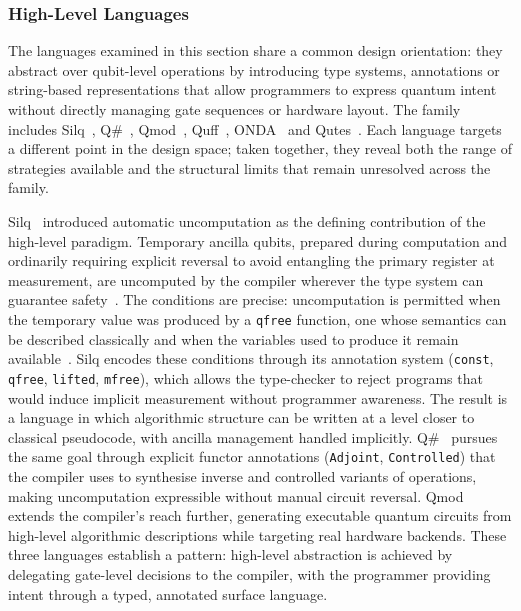 \subsubsection{High-Level Languages}\label{subsubsec:lit_rev:qpl:highlevel}
The languages examined in this section share a common design orientation: they abstract over qubit-level operations by introducing type systems, annotations or string-based representations that allow programmers to express quantum intent without directly managing gate sequences or hardware layout.
The family includes Silq~\cite{bichsel2020silq}, Q\#~\cite{MicrosoftQSharpOverview}, Qmod~\cite{vax2025qmodexpressivehighlevelquantum}, Quff~\cite{wright2024quff}, ONDA~\cite{degregorio2024onda} and Qutes~\cite{faro2025qutes}.
Each language targets a different point in the design space; taken together, they reveal both the range of strategies available and the structural limits that remain unresolved across the family.

Silq~\cite{bichsel2020silq} introduced automatic uncomputation as the defining contribution of the high-level paradigm.
Temporary ancilla qubits, prepared during computation and ordinarily requiring explicit reversal to avoid entangling the primary register at measurement, are uncomputed by the compiler wherever the type system can guarantee safety~\cite{bichsel2020silq}.
The conditions are precise: uncomputation is permitted when the temporary value was produced by a \texttt{qfree} function, one whose semantics can be described classically and when the variables used to produce it remain available~\cite{bichsel2020silq}.
Silq encodes these conditions through its annotation system (\texttt{const}, \texttt{qfree}, \texttt{lifted}, \texttt{mfree}), which allows the type-checker to reject programs that would induce implicit measurement without programmer awareness.
The result is a language in which algorithmic structure can be written at a level closer to classical pseudocode, with ancilla management handled implicitly.
Q\#~\cite{MicrosoftQSharpOverview} pursues the same goal through explicit functor annotations (\texttt{Adjoint}, \texttt{Controlled}) that the compiler uses to synthesise inverse and controlled variants of operations, making uncomputation expressible without manual circuit reversal.
Qmod~\cite{vax2025qmodexpressivehighlevelquantum} extends the compiler's reach further, generating executable quantum circuits from high-level algorithmic descriptions while targeting real hardware backends.
These three languages establish a pattern: high-level abstraction is achieved by delegating gate-level decisions to the compiler, with the programmer providing intent through a typed, annotated surface language.

